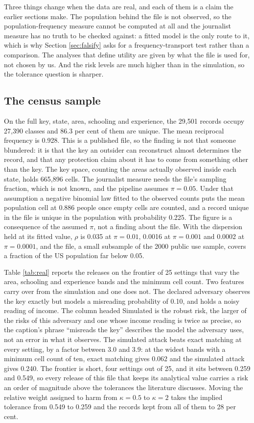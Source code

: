 \documentclass[11pt,a4paper]{article}
\theoremstyle{plain}
\theoremstyle{definition}
\begin{document}
Three things change when the data are real, and each of them is a claim the
earlier sections make. The population behind the file is not observed, so the
population-frequency measure cannot be computed at all and the journalist measure
has no truth to be checked against: a fitted model is the only route to it, which
is why Section \ref{sec:falsify} asks for a frequency-transport test rather than a
comparison. The analyses that define utility are given by what the file is used
for, not chosen by us. And the risk levels are much higher than in the simulation,
so the tolerance question is sharper.

\subsection{The census sample}

On the full key, state, area, schooling and experience, the 29,501 records occupy
27,390 classes and 86.3 per cent of them are unique. The mean reciprocal frequency
is 0.928. This is a published file, so the finding is not that someone blundered:
it is that the key an outsider can reconstruct almost determines the record, and
that any protection claim about it has to come from something other than the key.
The key space, counting the areas actually observed inside each state, holds
665,896 cells. The journalist measure needs the file's sampling fraction, which
is not known, and the pipeline assumes $\pi = 0.05$. Under that assumption a
negative binomial law fitted to the observed counts puts the mean population
cell at 0.886 people once empty cells are counted, and a record unique in the
file is unique in the population with probability 0.225. The figure is a
consequence of the assumed $\pi$, not a finding about the file. With the
dispersion held at its fitted value, $\rho$ is 0.035 at $\pi = 0.01$, 0.0016 at
$\pi = 0.001$ and 0.0002 at $\pi = 0.0001$, and the file, a small subsample of
the 2000 public use sample, covers a fraction of the US population far below
0.05.

Table \ref{tab:real} reports the releases on the frontier of 25 settings that vary
the area, schooling and experience bands and the minimum cell count. Two features
carry over from the simulation and one does not. The declared adversary
observes the key exactly but models a misreading probability of 0.10, and holds a
noisy reading of income. The column headed Simulated is the robust risk, the
larger of the risks of this adversary and one whose income reading is twice as
precise, so the caption's phrase ``misreads the key'' describes the model the
adversary uses, not an error in what it observes. The simulated attack beats
exact matching at every setting, by a factor between 3.0 and 3.9: at the widest
bands with a minimum cell count of ten, exact matching gives 0.062 and the
simulated attack gives 0.240. The frontier is short, four settings out of 25, and
it sits between 0.259 and 0.549, so every release of this file that keeps its
analytical value carries a risk an order of magnitude above the tolerances the
literature discusses. Moving the relative weight assigned to harm from $\kappa = 0.5$ to $\kappa = 2$
takes the implied tolerance from 0.549 to 0.259 and the records kept from all of
them to 28 per cent.
\end{document}
